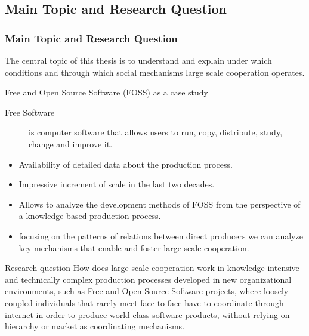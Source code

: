\documentclass[ignorenonframetext,red,8pt,notes=hide]{beamer}
\begin{document}
\subsection{Main Topic and Research Question}
\begin{frame}[label=]
\frametitle{Main Topic and Research Question}

The central topic of this thesis is to understand and explain under which conditions and through which social mechanisms large scale cooperation operates. 

\begin{block}{Free and Open Source Software (FOSS) as a case study}
\begin{description}
\item[Free Software] is computer software that allows users to run, copy, distribute, study, change and improve it.  
\end{description}
\begin{itemize}
\item Availability of detailed data about the production process.
\item Impressive increment of scale in the last two decades.
\item Allows to analyze the development methods of FOSS from the perspective of a knowledge based production process.
\item focusing on the patterns of relations between direct producers we can analyze key mechanisms that enable and foster large scale cooperation.
\end{itemize}
\end{block}

\pause

\begin{block}{Research question}
How does large scale cooperation work in knowledge intensive and technically complex production processes developed in new organizational environments, such as Free and Open Source Software projects, where loosely coupled individuals that rarely meet face to face have to coordinate through internet in order to produce world class software products, without relying on hierarchy or market as coordinating mechanisms.
\end{block}
\end{frame}
\end{document}
